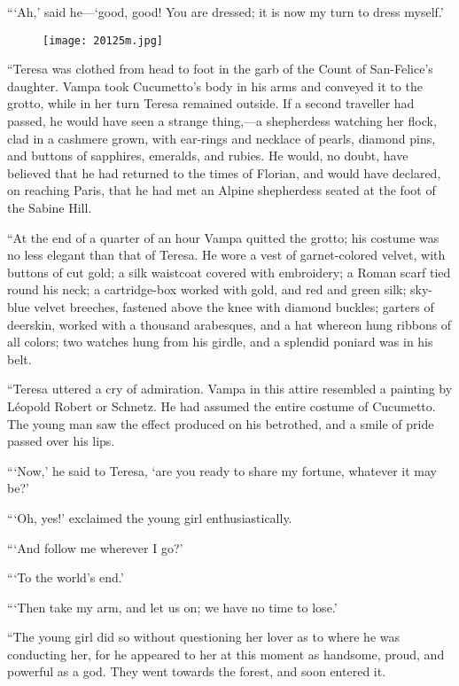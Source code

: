 “‘Ah,’ said he—‘good, good! You are dressed; it is now my turn to dress
myself.’

\begin{figure}[h]
\texttt{[image: 20125m.jpg]}
\end{figure}

“Teresa was clothed from head to foot in the garb of the Count of
San-Felice’s daughter. Vampa took Cucumetto’s body in his arms and
conveyed it to the grotto, while in her turn Teresa remained outside.
If a second traveller had passed, he would have seen a strange thing,—a
shepherdess watching her flock, clad in a cashmere grown, with
ear-rings and necklace of pearls, diamond pins, and buttons of
sapphires, emeralds, and rubies. He would, no doubt, have believed that
he had returned to the times of Florian, and would have declared, on
reaching Paris, that he had met an Alpine shepherdess seated at the
foot of the Sabine Hill.

“At the end of a quarter of an hour Vampa quitted the grotto; his
costume was no less elegant than that of Teresa. He wore a vest of
garnet-colored velvet, with buttons of cut gold; a silk waistcoat
covered with embroidery; a Roman scarf tied round his neck; a
cartridge-box worked with gold, and red and green silk; sky-blue velvet
breeches, fastened above the knee with diamond buckles; garters of
deerskin, worked with a thousand arabesques, and a hat whereon hung
ribbons of all colors; two watches hung from his girdle, and a splendid
poniard was in his belt.

“Teresa uttered a cry of admiration. Vampa in this attire resembled a
painting by Léopold Robert or Schnetz. He had assumed the entire
costume of Cucumetto. The young man saw the effect produced on his
betrothed, and a smile of pride passed over his lips.

“‘Now,’ he said to Teresa, ‘are you ready to share my fortune, whatever
it may be?’

“‘Oh, yes!’ exclaimed the young girl enthusiastically.

“‘And follow me wherever I go?’

“‘To the world’s end.’

“‘Then take my arm, and let us on; we have no time to lose.’

“The young girl did so without questioning her lover as to where he was
conducting her, for he appeared to her at this moment as handsome,
proud, and powerful as a god. They went towards the forest, and soon
entered it.

